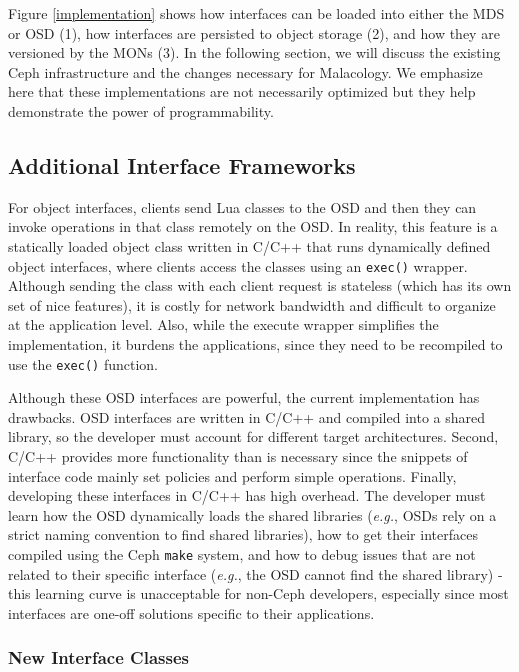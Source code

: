 \documentclass[10pt,twocolumn]{article}
\begin{document}
Figure \ref{implementation} shows how interfaces can be loaded into
either the MDS or OSD (1), how interfaces are persisted to object
storage (2), and how they are versioned by the MONs (3). In the
following section, we will discuss the existing Ceph infrastructure and
the changes necessary for Malacology. We emphasize here that these
implementations are not necessarily optimized but they help demonstrate
the power of programmability.

\subsection{Additional Interface
Frameworks}\label{additional-interface-frameworks}

For object interfaces, clients send Lua classes to the OSD and then they
can invoke operations in that class remotely on the OSD. In reality,
this feature is a statically loaded object class written in C/C++ that
runs dynamically defined object interfaces, where clients access the
classes using an \texttt{exec()} wrapper. Although sending the class
with each client request is stateless (which has its own set of nice
features), it is costly for network bandwidth and difficult to organize
at the application level. Also, while the execute wrapper simplifies the
implementation, it burdens the applications, since they need to be
recompiled to use the \texttt{exec()} function.

Although these OSD interfaces are powerful, the current implementation
has drawbacks. OSD interfaces are written in C/C++ and compiled into a
shared library, so the developer must account for different target
architectures. Second, C/C++ provides more functionality than is
necessary since the snippets of interface code mainly set policies and
perform simple operations. Finally, developing these interfaces in C/C++
has high overhead. The developer must learn how the OSD dynamically
loads the shared libraries (\emph{e.g.}, OSDs rely on a strict naming
convention to find shared libraries), how to get their interfaces
compiled using the Ceph \texttt{make} system, and how to debug issues
that are not related to their specific interface (\emph{e.g.}, the OSD
cannot find the shared library) - this learning curve is unacceptable
for non-Ceph developers, especially since most interfaces are one-off
solutions specific to their applications.

\subsubsection{New Interface Classes}\label{new-interface-classes}
\end{document}
